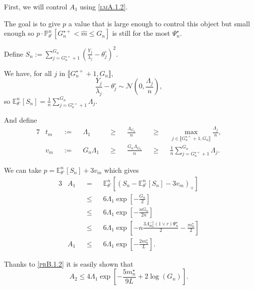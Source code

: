 \medskip

First, we will control $A_{1}$ using \textsc{\cref{lmA.1.2}}.

The goal is to give $p$ a value that is large enough to control this object but small enough so $p \cdot \mathds{P}_{\theta^{\circ}}^{n} \left[G_{n}^{\star+} < \widehat{m} \leq G_{n}\right]$ is still for the most $\Psi_{n}^{\star}$.

Define $S_{n} := \sum\limits_{j = G_{n}^{\star+} + 1}^{G_{n}}\left(\frac{Y_{j}}{\lambda_{j}} - \theta^{\circ}_{j}\right)^{2}.$

We have, for all $j$ in $\llbracket G_{n}^{\star+} + 1, G_{n} \rrbracket$,
\[ \frac{Y_{j}}{\lambda_{j}} - \theta^{\circ}_{j} \sim \mathcal{N}\left(0, \frac{\Lambda_{j}}{n} \right), \]
so $\mathds{E}_{\theta^{\circ}}^{n}\left[S_{n}\right] = \frac{1}{n} \sum\limits_{j = G_{n}^{\star+} + 1}^{G_{n}} \Lambda_{j}$.

And define
\begin{alignat*}{7}
& t_{m} && := && \Lambda_{1} && \geq && \frac{\Lambda_{G_{n}}}{n} && \geq && \max\limits_{j \in \llbracket G_{n}^{\star+} + 1, G_{n} \rrbracket} \frac{\Lambda_{j}}{n},\\
& v_{m} && := && G_{n} \Lambda_{1} && \geq && \frac{G_{n} \Lambda_{G_{n}}}{n} && \geq &&  \frac{1}{n} \sum\limits_{j = G_{n}^{\star+} + 1}^{G_{n}} \Lambda_{j}.
\end{alignat*}

We can take $p = \mathds{E}_{\theta^{\circ}}^{n}\left[S_{n}\right] + 3 v_{m}$ which gives
\begin{alignat*}{3}
& A_{1} && = && \mathds{E}_{\theta^{\circ}}^{n}\left[\left(S_{n} - \mathds{E}_{\theta^{\circ}}^{n}\left[S_{n}\right] - 3 v_{m}\right)_{+}\right]\\
& && \leq && 6 \Lambda_{1} \exp\left[- \frac{G_{n}}{2}\right]\\
& && \leq && 6 \Lambda_{1} \exp\left[- \frac{n G_{n}}{2 n}\right]\\
& && \leq && 6 \Lambda_{1} \exp\left[- n \frac{3 \Lambda_{m_{n}^{\star}}^{-1} \left(1 \vee r \right) \Psi_{n}^{\star}}{2} - \frac{m_{n}^{\star}}{2}\right]\\
& A_{1} && \leq && 6 \Lambda_{1} \exp\left[- \frac{2 m_{n}^{\star}}{L}\right].
\end{alignat*}

\medskip

Thanks to \textsc{\cref{prB.1.2}} it is easily shown that
\[A_{2} \leq 4 \Lambda_{1} \exp\left[-\frac{5 m_{n}^{\star}}{9 L} + 2 \log \left(G_{n}\right)\right].\]

